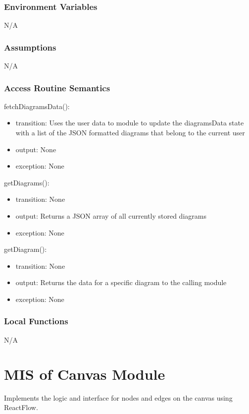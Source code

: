 \documentclass[12pt, titlepage]{article}
\begin{document}
\subsubsection{Environment Variables}

N/A

\subsubsection{Assumptions}

N/A

\subsubsection{Access Routine Semantics}

\noindent fetchDiagramsData():
\begin{itemize}
\item transition: Uses the user data to module to update the diagramsData state with a list of the JSON formatted diagrams that belong to the current user
\item output: None
\item exception: None
\end{itemize}

\noindent getDiagrams():
\begin{itemize}
\item transition: None
\item output: Returns a JSON array of all currently stored diagrams
\item exception: None
\end{itemize}

\noindent getDiagram():
\begin{itemize}
\item transition: None
\item output: Returns the data for a specific diagram to the calling module
\item exception: None
\end{itemize}


\subsubsection{Local Functions}

N/A

\newpage
\section{MIS of Canvas Module} \label{mCanvasMIS} 
Implements the logic and interface for nodes and edges on the canvas using ReactFlow.
\end{document}
